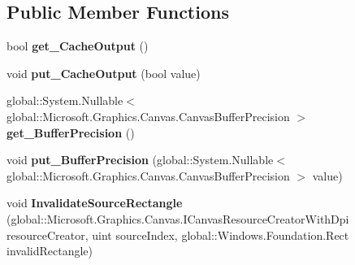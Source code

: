 \subsection*{Public Member Functions}
\begin{DoxyCompactItemize}
\item 
\mbox{\label{interface_microsoft_1_1_graphics_1_1_canvas_1_1_effects_1_1_i_canvas_effect_ade35aa78196aaa6fe9447696abb6d07f}} 
bool {\bfseries get\+\_\+\+Cache\+Output} ()
\item 
\mbox{\label{interface_microsoft_1_1_graphics_1_1_canvas_1_1_effects_1_1_i_canvas_effect_a83327dc0bb363f6f878802f5c971c033}} 
void {\bfseries put\+\_\+\+Cache\+Output} (bool value)
\item 
\mbox{\label{interface_microsoft_1_1_graphics_1_1_canvas_1_1_effects_1_1_i_canvas_effect_acbbcd7b5f2c9c1556c6ae4851cb48afa}} 
global\+::\+System.\+Nullable$<$ global\+::\+Microsoft.\+Graphics.\+Canvas.\+Canvas\+Buffer\+Precision $>$ {\bfseries get\+\_\+\+Buffer\+Precision} ()
\item 
\mbox{\label{interface_microsoft_1_1_graphics_1_1_canvas_1_1_effects_1_1_i_canvas_effect_ac02a7bea19253c3a3cf5522b88da9a92}} 
void {\bfseries put\+\_\+\+Buffer\+Precision} (global\+::\+System.\+Nullable$<$ global\+::\+Microsoft.\+Graphics.\+Canvas.\+Canvas\+Buffer\+Precision $>$ value)
\item 
\mbox{\label{interface_microsoft_1_1_graphics_1_1_canvas_1_1_effects_1_1_i_canvas_effect_aa08a935649c3289f85829be386bd22e0}} 
void {\bfseries Invalidate\+Source\+Rectangle} (global\+::\+Microsoft.\+Graphics.\+Canvas.\+I\+Canvas\+Resource\+Creator\+With\+Dpi resource\+Creator, uint source\+Index, global\+::\+Windows.\+Foundation.\+Rect invalid\+Rectangle)
\item 
\mbox{\label{interface_microsoft_1_1_graphics_1_1_canvas_1_1_effects_1_1_i_canvas_effect_a0220e194166c3d00d600f6b875b53a99}} 

\end{DoxyCompactItemize}

